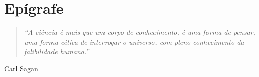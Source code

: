 \section{Epígrafe}\label{sec:epigrafe}
\begin{quote}
    \textit{``A ciência é mais que um corpo de conhecimento, é uma forma de pensar, uma forma cética de interrogar o universo, com pleno conhecimento da falibilidade humana.''}
\end{quote}
\begin{flushright}
Carl Sagan
\end{flushright}

